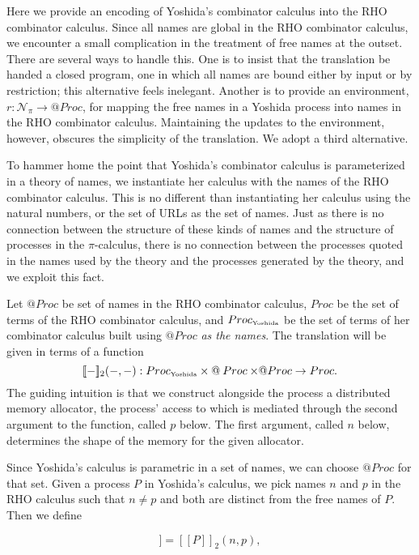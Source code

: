 \documentclass{llncs}
\makeatletter
\newcommand{\pic}{$\pi$-calculus}
\newcommand{\ldb}{[\![}
\newcommand{\rdb}{]\!]}
\newcommand{\quotep}[1]{\mathsf{@}#1}
\newcommand{\meaningof}[1]{\ldb #1 \rdb}
\newcommand{\Proc}{\mathbin{Proc}}
\newcommand{\QProc}{\quotep{\mathbin{Proc}}}
\newcommand{\red}{\rightarrow}
\makeatother
\begin{document}
Here we provide an encoding of Yoshida's combinator calculus into the
RHO combinator calculus. Since all names are global in the RHO
combinator calculus, we encounter a small complication in the
treatment of free names at the outset. There are several ways to
handle this.  One is to insist that the translation be handed a closed
program, one in which all names are bound either by input or by
restriction; this alternative feels inelegant. Another is to provide
an environment, $r : \mathcal{N}_{\pi} \rightarrow \QProc$, for
mapping the free names in a Yoshida process into names in the RHO
combinator calculus. Maintaining the updates to the environment,
however, obscures the simplicity of the translation. We adopt a third
alternative.

To hammer home the point that Yoshida's combinator calculus is
parameterized in a theory of names, we instantiate her calculus with
the names of the RHO combinator calculus. This is no different than
instantiating her calculus using the natural numbers, or the set of URLs as the
set of names. Just as there is no connection between the structure of
these kinds of names and the structure of processes in the {\pic},
there is no connection between the processes quoted in the names used
by the theory and the processes generated by the theory, and we
exploit this fact.

Let $\QProc$ be set of names in the RHO combinator calculus, $\Proc$
be the set of terms of the RHO combinator calculus, and
$\Proc_{\mbox{\tiny Yoshida}}$ be the set of terms of her combinator
calculus built using $\QProc$ \emph{as the names}. The translation will be
given in terms of a function \[\meaningof{-}_2( -, - ) : 
    \Proc_{\mbox{\tiny Yoshida}} \times \QProc {\times} \QProc \red \Proc.\] 
The guiding intuition is that we construct alongside the process a distributed memory
allocator, the process' access to which is mediated through the second argument
to the function, called $p$ below. The first argument, called $n$ below, determines the shape of the memory for the given allocator.

Since Yoshida's calculus is parametric in a set of names, we can
choose $\QProc$ for that set.  Given a process $P$ in Yoshida's
calculus, we pick names $n$ and $p$ in the RHO calculus such that $n \neq p$
and both are distinct from the free names of $P$.  Then we define

\begin{equation*}
  \meaningof{P} = \meaningof{P}_2(n, p),
\end{equation*}
\end{document}
